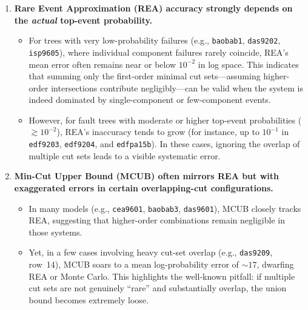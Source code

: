 \begin{enumerate}
    \item \textbf{Rare Event Approximation (REA) accuracy strongly depends on the \emph{actual} top-event probability.}
    \begin{itemize}
        \item For trees with very low-probability failures (e.g., \texttt{baobab1}, \texttt{das9202}, \texttt{isp9605}), where individual component failures rarely coincide, REA's mean error often remains near or below \(10^{-2}\) in log space. This indicates that summing only the first-order minimal cut sets—assuming higher-order intersections contribute negligibly—can be valid when the system is indeed dominated by single-component or few-component events.
        \item However, for fault trees with moderate or higher top-event probabilities (\(\gtrsim 10^{-2}\)), REA's inaccuracy tends to grow (for instance, up to \(10^{-1}\) in \texttt{edf9203}, \texttt{edf9204}, and \texttt{edfpa15b}). In these cases, ignoring the overlap of multiple cut sets leads to a visible systematic error.
    \end{itemize}

    \item \textbf{Min-Cut Upper Bound (MCUB) often mirrors REA but with exaggerated errors in certain overlapping-cut configurations.}
    \begin{itemize}
        \item In many models (e.g., \texttt{cea9601}, \texttt{baobab3}, \texttt{das9601}), MCUB closely tracks REA, suggesting that higher-order combinations remain negligible in those systems.
        \item Yet, in a few cases involving heavy cut-set overlap (e.g., \texttt{das9209}, row~14), MCUB soars to a mean log-probability error of \(\sim 17\), dwarfing REA or Monte Carlo. This highlights the well-known pitfall: if multiple cut sets are not genuinely ``rare'' and substantially overlap, the union bound becomes extremely loose.
    \end{itemize}


\end{enumerate}
